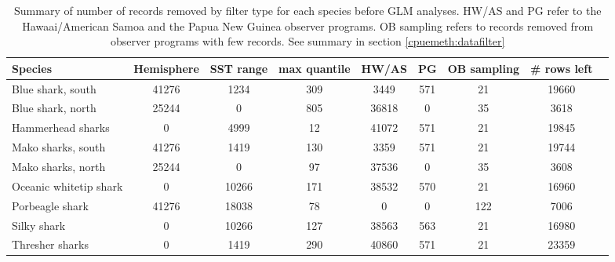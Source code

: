 \clearpage
\begin{landscape}
\thispagestyle{empty}
 \begin{table}[!h]
\caption{Summary of number of records removed by filter type for each species before GLM analyses. HW/AS and PG refer to the Hawaai/American Samoa and the Papua New Guinea observer programs. OB sampling refers to records removed from observer programs with few records. See summary in section \ref{cpuemeth:datafilter} \label{tbl:glmdata}}
\begin{center}
\begin{tabular}{l|c|c|c|c|c|c|c|c}
Species & Hemisphere & SST range & max quantile & HW/AS & PG & OB sampling & \# rows left\\
\hline
\hline
Blue shark, south&41276&1234&309&3449&571&21&19660\\ 
Blue shark, north&25244&0&805&36818&0&35&3618\\ 
Hammerhead sharks&0&4999&12&41072&571&21&19845\\ 
Mako sharks, south&41276&1419&130&3359&571&21&19744\\ 
Mako sharks, north&25244&0&97&37536&0&35&3608\\ 
Oceanic whitetip shark&0&10266&171&38532&570&21&16960\\ 
Porbeagle shark&41276&18038&78&0&0&122&7006\\ 
Silky shark&0&10266&127&38563&563&21&16980\\ 
Thresher sharks&0&1419&290&40860&571&21&23359\\


\end{tabular}
\end{center}
\end{table}
\end{landscape}
